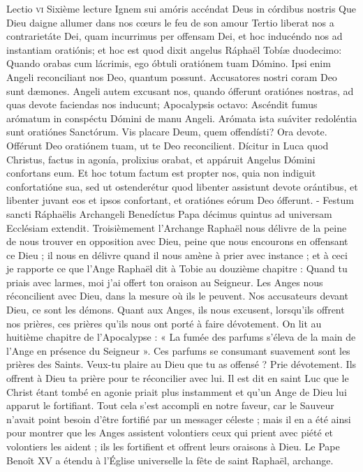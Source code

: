 \documentclass[twoside]{article}
\begin{document}
\begin{paracol}[1]{2}
\lectioresponsorium
	{Lectio \textsc{vi}}
	{Sixième lecture}
	{Ignem sui amóris accéndat Deus in córdibus nostris}
	{Que Dieu daigne allumer dans nos cœurs le feu de son amour}
	{
		Tertio liberat nos a contrarietáte Dei, quam incurrimus per offensam Dei, et hoc inducéndo nos ad instantiam oratiónis; et hoc est quod dixit angelus Ráphaël Tobíæ duodecimo: Quando orabas cum lácrimis, ego óbtuli oratiónem tuam Dómino. Ipsi enim Angeli reconciliant nos Deo, quantum possunt. Accusatores nostri coram Deo sunt dæmones. Angeli autem excusant nos, quando ófferunt oratiónes nostras, ad quas devote faciendas nos inducunt; Apocalypsis octavo: Ascéndit fumus arómatum in conspéctu Dómini de manu Angeli. Arómata ista suáviter redoléntia sunt oratiónes Sanctórum. Vis placare Deum, quem offendísti? Ora devote. Offérunt Deo oratiónem tuam, ut te Deo reconcilient. Dícitur in Luca quod Christus, factus in agonía, prolixius orabat, et appáruit Angelus Dómini confortans eum. Et hoc totum factum est propter nos, quia non indiguit confortatióne sua, sed ut ostenderétur quod libenter assistunt devote orántibus, et libenter juvant eos et ipsos confortant, et oratiónes eórum Deo ófferunt. - Festum sancti Ráphaëlis Archangeli Benedíctus Papa décimus quintus ad universam Ecclésiam extendit.
	}
	{
		Troisièmement l’Archange Raphaël nous délivre de la peine de nous trouver en opposition avec Dieu, peine que nous encourons en offensant ce Dieu ; il nous en délivre quand il nous amène à prier avec instance ; et à ceci je rapporte ce que l’Ange Raphaël dit à Tobie au douzième chapitre : Quand tu priais avec larmes, moi j’ai offert ton oraison au Seigneur. Les Anges nous réconcilient avec Dieu, dans la mesure où ils le peuvent. Nos accusateurs devant Dieu, ce sont les démons. Quant aux Anges, ils nous excusent, lorsqu’ils offrent nos prières, ces prières qu’ils nous ont porté à faire dévotement. On lit au huitième chapitre de l’Apocalypse : « La fumée des parfums s’éleva de la main de l’Ange en présence du Seigneur ». Ces parfums se consumant suavement sont les prières des Saints. Veux-tu plaire au Dieu que tu as offensé ? Prie dévotement. Ils offrent à Dieu ta prière pour te réconcilier avec lui. Il est dit en saint Luc que le Christ étant tombé en agonie priait plus instamment et qu’un Ange de Dieu lui apparut le fortifiant. Tout cela s’est accompli en notre faveur, car le Sauveur n’avait point besoin d’être fortifié par un messager céleste ; mais il en a été ainsi pour montrer que les Anges assistent volontiers ceux qui prient avec piété et volontiers les aident ; ils les fortifient et offrent leurs oraisons à Dieu. Le Pape Benoît XV a étendu à l’Église universelle la fête de saint Raphaël, archange.
}
\end{paracol}
\end{document}
